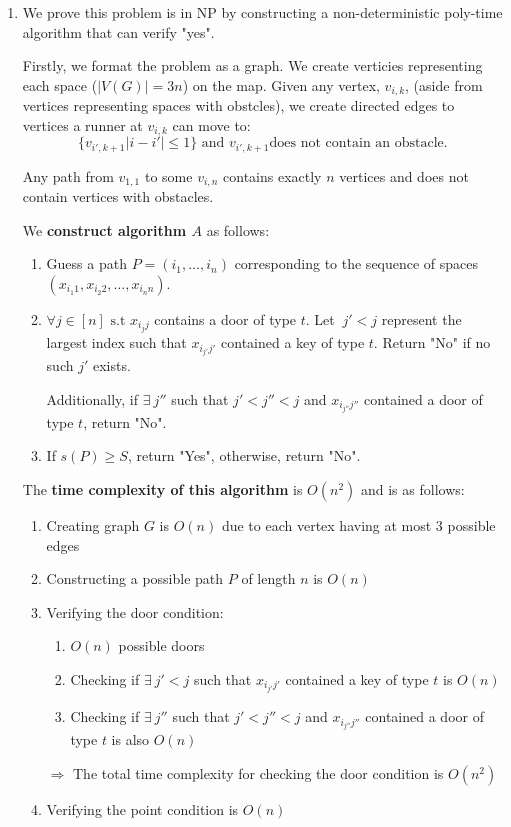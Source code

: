 \documentclass[12pt]{article}
\newcommand{\st}{\text{ s.t }}
\newcommand{\tand}{\text{ and }}
\begin{document}
\begin{enumerate}
\item We prove this problem is in NP by constructing a non-deterministic poly-time algorithm that can verify "yes". 
  
  Firstly, we format the problem as a graph. We create verticies representing each space ($|V(G)| = 3n$) on the map. Given any vertex, $v_{i,k}$, (aside from vertices representing spaces with obstcles), we create directed edges to vertices a runner at $v_{i,k}$ can move to:
  \[ \{v_{i',k+1} |i - i'| \le 1\} \tand v_{i',k+1} \text{does not contain an obstacle.}\]
    
  Any path from $v_{1,1}$ to some $v_{i,n}$ contains exactly $n$ vertices and does not contain vertices with obstacles.
  
  We \textbf{construct algorithm $A$} as follows:
  \begin{enumerate}
    \item Guess a path $P = (i_1,\dots,i_n)$ corresponding to the sequence of spaces $(x_{{i_1}1}, x_{{i_2}2},\dots, x_{{i_n}n})$.
    
    \item $\forall j \in [n] \st x_{{i_j}j}$ contains a door of type $t$. Let $~j' < j$ represent the largest index such that $x_{{i_{j'}}{j'}}$ contained a key of type $t$. Return "No" if no such $j'$ exists.
    
    Additionally, if $\exists ~j''$ such that $j' < j'' < j$ and $x_{{i_{j''}}{j''}}$ contained a door of type $t$, return "No".
    
    \item If $s(P) \ge S$, return "Yes", otherwise, return "No".
  \end{enumerate}

  The \textbf{time complexity of this algorithm} is $O(n^2)$ and is as follows:
  \begin{enumerate}
    \item Creating graph $G$ is $O(n)$ due to each vertex having at most 3 possible edges
    \item Constructing a possible path $P$ of length $n$ is $O(n)$
    \item Verifying the door condition:
      \begin{enumerate}
        \item $O(n)$ possible doors
        \item Checking if $\exists ~j' < j$ such that $x_{{i_{j'}}{j'}}$ contained a key of type $t$ is $O(n)$
        \item Checking if $\exists ~j''$ such that $j' < j'' < j$ and $x_{{i_{j''}}{j''}}$ contained a door of type $t$ is also $O(n)$
      \end{enumerate}
      $\Rightarrow$ The total time complexity for checking the door condition is $O(n^2)$
    \item Verifying the point condition is $O(n)$
  \end{enumerate}


\end{enumerate}
\end{document}
